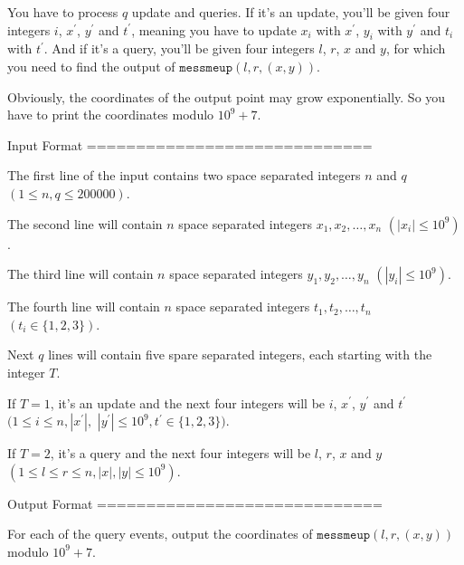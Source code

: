 You have to process $q$ update and queries. If it's an update, you'll be
given four integers $i$, $x^\prime$, $y^\prime$ and $t^\prime$, meaning you
have
to update $x_i$ with $x^\prime$, $y_i$ with $y^\prime$ and $t_i$ with
$t^\prime$. And if it's a query, you'll be given four integers $l$, $r$, $x$
and $y$, for which you need to find the output of $\texttt{messmeup}(l, r,
(x, y))$.

Obviously, the coordinates of the output point may grow exponentially. So you
have to print the coordinates modulo $10^9+7$.


Input Format
=============================

The first line of the input contains two space separated integers $n$ and $q$
$(1 \le n, q \le 200000)$.

The second line will contain $n$ space separated integers $x_1, x_2, \ldots,
x_n$ $(|x_i| \le 10^9)$.

The third line will contain $n$ space separated integers $y_1, y_2, \ldots,
y_n$ $(|y_i| \le 10^9)$.

The fourth line will contain $n$ space separated integers $t_1, t_2, \ldots,
t_n$ $(t_i \in \{ 1, 2, 3 \})$.

Next $q$ lines will contain five spare separated integers, each starting with
the integer $T$.

If $T = 1$, it's an update and the next four integers will be $i$,
$x^\prime$, $y^\prime$ and $t^\prime$ $(1 \le i \le n, |x^\prime|,$
$|y^\prime| \le 10^9, t^\prime \in \{ 1, 2, 3 \})$.

If $T = 2$, it's a query and the next four integers will be $l$, $r$, $x$ and
$y$ $(1 \le l \le r \le n, |x|, |y| \le 10^9)$.


Output Format
=============================

For each of the query events, output the coordinates of $\texttt{messmeup}(l,
r, (x, y))$ modulo $10^9 + 7$.
